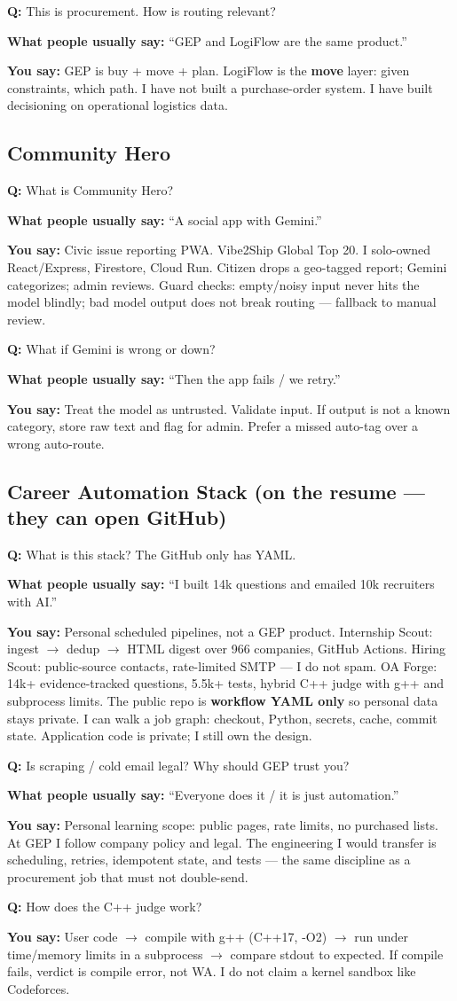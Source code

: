 \documentclass[a4paper,9.5pt]{extarticle}
\newcommand{\Q}[1]{\par\vspace{1.5pt}\noindent\textcolor{hot}{\textbf{Q:} #1}\par}
\newcommand{\Typ}[1]{\noindent\textcolor{muted}{\textbf{What people usually say:} #1}\par}
\newcommand{\Say}[1]{\noindent\textcolor{ok}{\textbf{You say:} #1}\par}
\begin{document}
\Q{This is procurement. How is routing relevant?}
\Typ{``GEP and LogiFlow are the same product.''}
\Say{GEP is buy + move + plan. LogiFlow is the \textbf{move} layer: given constraints, which path. I have not built a purchase-order system. I have built decisioning on operational logistics data.}

\subsection{Community Hero}
\Q{What is Community Hero?}
\Typ{``A social app with Gemini.''}
\Say{Civic issue reporting PWA. Vibe2Ship Global Top 20. I solo-owned React/Express, Firestore, Cloud Run. Citizen drops a geo-tagged report; Gemini categorizes; admin reviews. Guard checks: empty/noisy input never hits the model blindly; bad model output does not break routing --- fallback to manual review.}

\Q{What if Gemini is wrong or down?}
\Typ{``Then the app fails / we retry.''}
\Say{Treat the model as untrusted. Validate input. If output is not a known category, store raw text and flag for admin. Prefer a missed auto-tag over a wrong auto-route.}

\subsection{Career Automation Stack (on the resume --- they can open GitHub)}
\Q{What is this stack? The GitHub only has YAML.}
\Typ{``I built 14k questions and emailed 10k recruiters with AI.''}
\Say{Personal scheduled pipelines, not a GEP product. Internship Scout: ingest $\to$ dedup $\to$ HTML digest over 966 companies, GitHub Actions. Hiring Scout: public-source contacts, rate-limited SMTP --- I do not spam. OA Forge: 14k+ evidence-tracked questions, 5.5k+ tests, hybrid C++ judge with g++ and subprocess limits. The public repo is \textbf{workflow YAML only} so personal data stays private. I can walk a job graph: checkout, Python, secrets, cache, commit state. Application code is private; I still own the design.}

\Q{Is scraping / cold email legal? Why should GEP trust you?}
\Typ{``Everyone does it / it is just automation.''}
\Say{Personal learning scope: public pages, rate limits, no purchased lists. At GEP I follow company policy and legal. The engineering I would transfer is scheduling, retries, idempotent state, and tests --- the same discipline as a procurement job that must not double-send.}

\Q{How does the C++ judge work?}
\Say{User code $\to$ compile with g++ (C++17, -O2) $\to$ run under time/memory limits in a subprocess $\to$ compare stdout to expected. If compile fails, verdict is compile error, not WA. I do not claim a kernel sandbox like Codeforces.}
\end{document}
